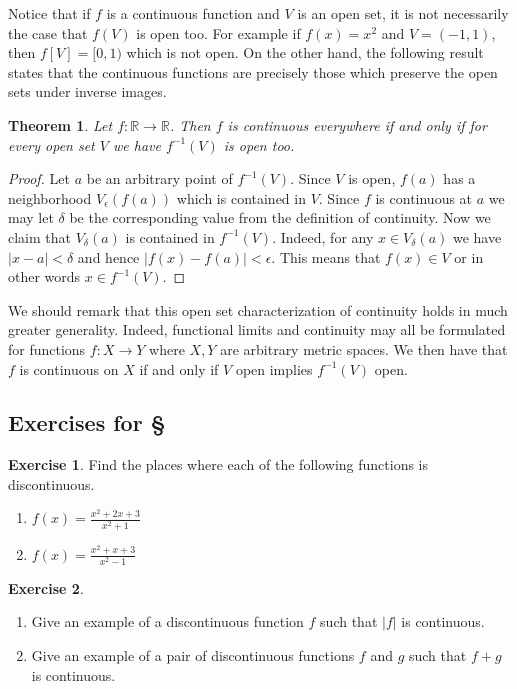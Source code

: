 \documentclass[11pt,oneside]{amsbook}
\newcommand{\RR}{\mathbb R}
\theoremstyle{definition}
\newtheorem{exerc}{Exercise}[section]
\theoremstyle{plain}
\newtheorem{thm}{Theorem}[section]
\theoremstyle{definition}
\theoremstyle{remark}
\numberwithin{equation}{section}
\numberwithin{figure}{section}
\begin{document}
Notice that if $f$ is a continuous function and $V$ is an open set, it is not necessarily the case that $f(V)$ is open too. For example if $f(x)=x^2$ and $V=(-1,1)$, then $f[V]=[0,1)$ which is not open. On the other hand, the following result states that the continuous functions are precisely those which preserve the open sets under inverse images.

\begin{thm}
  Let $f\colon\RR\to\RR$. Then $f$ is continuous everywhere if and only if for every open set $V$ we have $f^{-1}(V)$ is open too.
\end{thm}

\begin{proof}
  Let $a$ be an arbitrary point of $f^{-1}(V)$. Since $V$ is open, $f(a)$ has a neighborhood $V_\epsilon(f(a))$ which is contained in $V$. Since $f$ is continuous at $a$ we may let $\delta$ be the corresponding value from the definition of continuity. Now we claim that $V_\delta(a)$ is contained in $f^{-1}(V)$. Indeed, for any $x\in V_\delta(a)$ we have $|x-a|<\delta$ and hence $|f(x)-f(a)|<\epsilon$. This means that $f(x)\in V$ or in other words $x\in f^{-1}(V)$.
\end{proof}

We should remark that this open set characterization of continuity holds in much greater generality. Indeed, functional limits and continuity may all be formulated for functions $f\colon X\to Y$ where $X,Y$ are arbitrary metric spaces. We then have that $f$ is continuous on $X$ if and only if $V$ open implies $f^{-1}(V)$ open.

\newpage
\subsection*{Exercises for \S \thesection}

\begin{exerc}
  Find the places where each of the following functions is discontinuous.
  \begin{enumerate}
    \item $\displaystyle f(x)=\frac{x^2+2x+3}{x^2+1}$
    \item $\displaystyle f(x)=\frac{x^2+x+3}{x^2-1}$
  \end{enumerate}
\end{exerc}
  
\begin{exerc}
  \begin{enumerate}
    \item Give an example of a discontinuous function $f$ such that $|f|$ is continuous.
    \item Give an example of a pair of discontinuous functions $f$ and $g$ such that $f+g$ is continuous.
  \end{enumerate}
\end{exerc}
  
\end{document}
